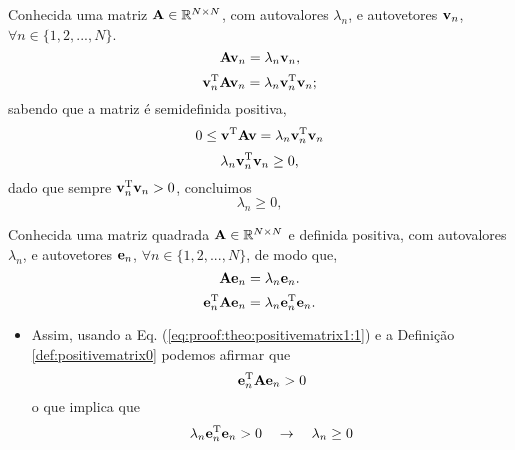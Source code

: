 \begin{myproofT}\label{proof:theo:semipositivematrix2}
Conhecida uma matriz $\MATRIX{A} \in \mathbb{R}^{N \times N}$, com  autovalores $\lambda_n$,
e autovetores $\VECTOR{v}_n$, $\forall n \in \{1, 2, ..., N\}$.
\begin{equation}
\MATRIX{A}\VECTOR{v}_n = \lambda_n \VECTOR{v}_n, 
\end{equation}
\begin{equation}
\VECTOR{v}_n^{\transpose}\MATRIX{A}\VECTOR{v}_n = \lambda_n \VECTOR{v}_n^{\transpose}\VECTOR{v}_n;
\end{equation}
sabendo que a matriz é semidefinida positiva,
\begin{equation}
0 \leq \VECTOR{v}^{\transpose}\MATRIX{A}\VECTOR{v} = \lambda_n \VECTOR{v}_n^{\transpose}\VECTOR{v}_n 
\end{equation}
\begin{equation}
\lambda_n \VECTOR{v}_n^{\transpose}\VECTOR{v}_n \geq 0,
\end{equation}
dado que sempre $\VECTOR{v}_n^{\transpose}\VECTOR{v}_n> 0$, concluimos
\begin{equation}
\lambda_n  \geq 0,
\end{equation} 
\end{myproofT}

\begin{myproofT}\label{proof:theo:positivematrix1}
Conhecida uma matriz quadrada $\MATRIX{A} \in \mathbb{R}^{N \times N}$ e definida positiva, com  autovalores $\lambda_n$,
e autovetores $\VECTOR{e}_n$, $\forall n \in \{1, 2, ..., N\}$, de modo que,
\begin{equation}\label{eq:proof:theo:positivematrix1:0}
\MATRIX{A}\VECTOR{e}_n=\lambda_n \VECTOR{e}_n.
\end{equation}
\begin{equation}\label{eq:proof:theo:positivematrix1:1}
\VECTOR{e}_n^{\transpose}\MATRIX{A}\VECTOR{e}_n=\lambda_n \VECTOR{e}_n^{\transpose}\VECTOR{e}_n.
\end{equation}

\begin{itemize}
\item Assim, usando a Eq. (\ref{eq:proof:theo:positivematrix1:1}) e a Definição \ref{def:positivematrix0} podemos afirmar que
\begin{equation}
\VECTOR{e}_n^{\transpose}\MATRIX{A}\VECTOR{e}_n >0
\end{equation} 
o que implica que
\begin{equation}
\lambda_n \VECTOR{e}_n^{\transpose}\VECTOR{e}_n > 0
\quad \rightarrow \quad
\lambda_n  \geq 0
\end{equation} 
\end{itemize}
\end{myproofT}


